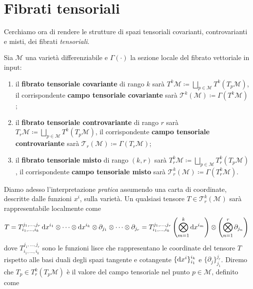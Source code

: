 \section{Fibrati tensoriali}
Cerchiamo ora di rendere le strutture di spazi tensoriali covarianti, controvarianti e misti, dei fibrati \emph{tensoriali}.
\begin{definition}
    Sia $\mathcal{M}$ una varietà differenziabile e $\Gamma(\cdot)$ la sezione locale del fibrato vettoriale in input:
    \begin{enumerate}
        \item il \textbf{fibrato tensoriale covariante} di rango $k$ sarà $T^k\mathcal{M} \coloneqq \bigsqcup_{p \in \mathcal{M}} T^k(T_p\mathcal{M})$, il corrispondente \textbf{campo tensoriale covariante} sarà $\mathcal{T}^k(\mathcal{M}) \coloneqq \Gamma (T^k\mathcal{M})$;
        \item il \textbf{fibrato tensoriale controvariante} di rango $r$ sarà $T_r\mathcal{M} \coloneqq \bigsqcup_{p \in \mathcal{M}} T^k(T_p\mathcal{M})$, il corrispondente \textbf{campo tensoriale controvariante} sarà $\mathcal{T}_r(\mathcal{M}) \coloneqq \Gamma (T_r\mathcal{M})$;
        \item il \textbf{fibrato tensoriale misto} di rango $(k,r)$ sarà $T_r^k\mathcal{M} \coloneqq \bigsqcup_{p \in \mathcal{M}} T_r^k(T_p\mathcal{M})$, il corrispondente \textbf{campo tensoriale misto} sarà $\mathcal{T}_r^k(\mathcal{M}) \coloneqq \Gamma (T_r^k\mathcal{M})$.
    \end{enumerate}
\end{definition}
Diamo adesso l'interpretazione \emph{pratica} assumendo una carta di coordinate, descritte dalle funzioni $x^i$, sulla varietà.
Un qualsiasi tensore $T \in \mathcal{T}^k_r(\mathcal{M})$ sarà rappresentabile localmente come
\begin{equation}
    T =
    T^{j_1, \dots, j_r}_{i_1, \dots, i_k} \odif{x^{i_1}} \otimes \cdots \otimes \odif{x^{i_k}} \otimes \partial_{j_1} \otimes \cdots \otimes \partial_{j_r} =
    T^{j_1, \dots, j_r}_{i_1, \dots, i_k} \left( \bigotimes_{m=1}^k \odif{x^{i_m}} \right) \otimes \left( \bigotimes_{n=1}^r \partial_{j_n} \right)
\end{equation}
dove $T^{j_1, \dots, j_r}_{i_1, \dots, i_k}$ sono le funzioni lisce che rappresentano le coordinate del tensore $T$ rispetto alle basi duali degli spazi tangente e cotangente $\{ \odif{x^i} \}_{i_1}^{i_k}$ e $\{ \partial_j \}_{j_1}^{j_r}$.
Diremo che $T_p \in T_r^k(T_p \mathcal{M})$ è il valore del campo tensoriale nel punto $p \in \mathcal{M}$, definito come
